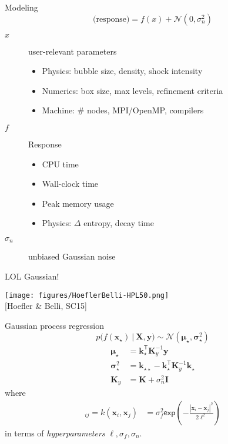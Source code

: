 \documentclass{beamer}
\newcommand{\matr}[1]{\bm{#1}}
\begin{document}
\begin{frame}{Modeling}
  \begin{equation*}
    \textrm{(response)} = f(x) + \mathcal N(0, \sigma_n^2)
  \end{equation*}
  \begin{description}
  \item[$x$] user-relevant parameters
    \begin{itemize}
    \item Physics: bubble size, density, shock intensity
    \item Numerics: box size, max levels, refinement criteria
    \item Machine: \# nodes, MPI/OpenMP, compilers
    \end{itemize}
  \item[$f$] Response
    \begin{itemize}
    \item CPU time
    \item Wall-clock time
    \item Peak memory usage
    \item Physics: $\Delta$ entropy, decay time
    \end{itemize}
  \item[$\sigma_n$] unbiased Gaussian noise
  \end{description}
\end{frame}

\begin{frame}{LOL Gaussian!}
  \begin{center}
    \texttt{[image: figures/HoeflerBelli-HPL50.png]} \\
    {\small [Hoefler \& Belli, SC15]}
  \end{center}
\end{frame}

\begin{frame}{Gaussian process regression}
  \begin{equation*}
    p\big( f(\matr{x}_\star)~|~\matr{X},\matr{y} \big) \sim 
    \mathcal{N} \left( \matr{\mu}_\star, \matr{\sigma}_{\star}^2 \right)
  \end{equation*}
  \begin{align*}	
    \matr{\mu}_\star &= \matr{k}_\star^\mathsf{T} \matr{K}_y ^{-1} \matr{y} \\
    \matr{\sigma}^2_\star  &= \matr{k}_{\star\star} - \matr{k}_\star^\mathsf{T} \matr{K}_y^{-1} \matr{k}_\star \\
    \matr{K}_y &= \matr{K} + \sigma^2_n\matr{I}
  \end{align*}
  where
  \begin{align*}
    [\matr{K}]_{ij} = k(\matr{x}_i, \matr{x}_j) &= \sigma^2_f  \mathsf{exp}\left( - \frac{ | \matr{x}_i-\matr{x}_j | ^2}{2\ell^2}  \right)
  \end{align*}
  in terms of \emph{hyperparameters} $\ell, \sigma_f, \sigma_n$.
\end{frame}
\end{document}
